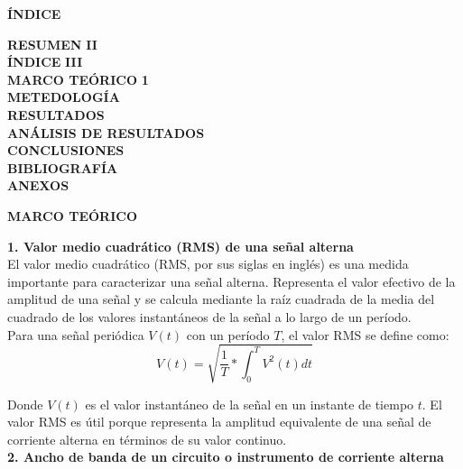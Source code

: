 \documentclass[12pt]{article}
\begin{document}
	\newpage
	
	\begin{center}
		\textbf{\large ÍNDICE}\\
	\end{center}
	
	\noindent \textbf{RESUMEN} \hfill \textbf{II}\\
	\noindent \textbf{ÍNDICE} \hfill \textbf{III}\\
	\noindent \textbf{MARCO TEÓRICO} \hfill \textbf{1}\\
	\noindent \textbf{METEDOLOGÍA} \hfill \textbf{}\\
	\noindent \textbf{RESULTADOS} \hfill \textbf{}\\
	\noindent \textbf{ANÁLISIS DE RESULTADOS} \hfill \textbf{}\\
	\noindent \textbf{CONCLUSIONES} \hfill \textbf{}\\
	\noindent \textbf{BIBLIOGRAFÍA} \hfill \textbf{}\\
	\noindent \textbf{ANEXOS} \hfill \textbf{}\\
	
	\newpage
	
	
	\begin{center}
		\textbf{\large MARCO TEÓRICO}\\
	\end{center}
	
	\textbf{1. Valor medio cuadrático (RMS) de una señal alterna}\\
	
	El valor medio cuadrático (RMS, por sus siglas en inglés) es una medida importante para caracterizar una señal alterna. Representa el valor efectivo de la amplitud de una señal y se calcula mediante la raíz cuadrada de la media del cuadrado de los valores instantáneos de la señal a lo largo de un período.\\
	
	Para una señal periódica $V(t)$ con un período $T$, el valor RMS se define como: $$V(t) = \sqrt{\frac{1}{T}*\int_{0}^{T}V^2(t)dt}$$	
	
	Donde $V(t)$ es el valor instantáneo de la señal en un instante de tiempo $t$. El valor RMS es útil porque representa la amplitud equivalente de una señal de corriente alterna en términos de su valor continuo.\\
	
	\textbf{2. Ancho de banda de un circuito o instrumento de corriente alterna}\\
	
\end{document}
